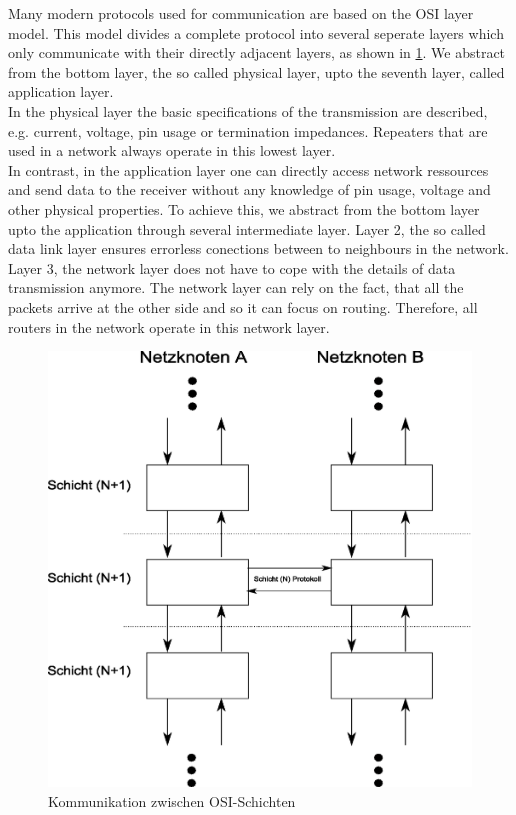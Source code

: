 \documentclass[a4paper]{book}%
\begin{document}
Many modern protocols used for communication are based on the OSI layer model. This model divides a complete protocol into several seperate layers which only communicate with their directly adjacent layers, as shown in \ref{fig:OSI-Schichtenkommunikation}. We abstract from the bottom layer, the so called physical layer, upto the seventh layer, called application layer.\\
In the physical layer the basic specifications of the transmission are described, e.g. current, voltage, pin usage or termination impedances. Repeaters that are used in a network always operate in this lowest layer.\\
In contrast, in the application layer one can directly access network ressources and send data to the receiver without any knowledge of pin usage, voltage and other physical properties. To achieve this, we abstract from the bottom layer upto the application through several intermediate layer. Layer 2, the so called data link layer ensures errorless conections between to neighbours in the network. Layer 3, the network layer does not have to cope with the details of data transmission anymore. The network layer can rely on the fact, that all the packets arrive at the other side and so it can focus on routing. Therefore, all routers in the network operate in this network layer.


\begin{figure}[H]
	\centering
	\includegraphics[width=1.0\textwidth]{figures/schichtkommunikation.eps}
	\caption[Communication between the OSI layers]{Kommunikation zwischen OSI-Schichten}
	\label{fig:OSI-Schichtenkommunikation}
\end{figure}
\end{document}
